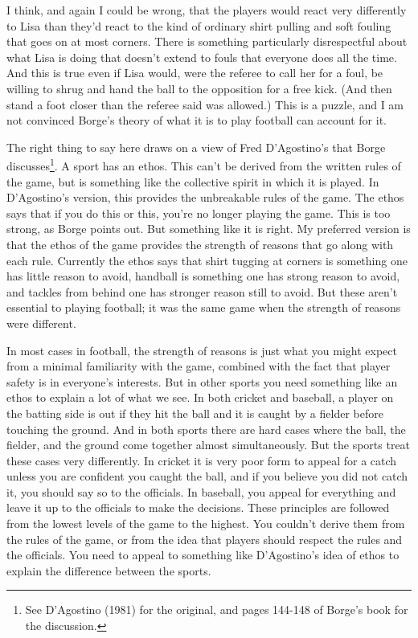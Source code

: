 \documentclass[
  12pt,
]{article}
\begin{document}
I think, and again I could be wrong, that the players would react very differently to Lisa than they'd react to the kind of ordinary shirt pulling and soft fouling that goes on at most corners. There is something particularly disrespectful about what Lisa is doing that doesn't extend to fouls that everyone does all the time. And this is true even if Lisa would, were the referee to call her for a foul, be willing to shrug and hand the ball to the opposition for a free kick. (And then stand a foot closer than the referee said was allowed.) This is a puzzle, and I am not convinced Borge's theory of what it is to play football can account for it.

The right thing to say here draws on a view of Fred D'Agostino's that Borge discusses\footnote{See D'Agostino (1981) for the original, and pages 144-148 of Borge's book for the discussion.}. A sport has an ethos. This can't be derived from the written rules of the game, but is something like the collective spirit in which it is played. In D'Agostino's version, this provides the unbreakable rules of the game. The ethos says that if you do this or this, you're no longer playing the game. This is too strong, as Borge points out. But something like it is right. My preferred version is that the ethos of the game provides the strength of reasons that go along with each rule. Currently the ethos says that shirt tugging at corners is something one has little reason to avoid, handball is something one has strong reason to avoid, and tackles from behind one has stronger reason still to avoid. But these aren't essential to playing football; it was the same game when the strength of reasons were different.

In most cases in football, the strength of reasons is just what you might expect from a minimal familiarity with the game, combined with the fact that player safety is in everyone's interests. But in other sports you need something like an ethos to explain a lot of what we see. In both cricket and baseball, a player on the batting side is out if they hit the ball and it is caught by a fielder before touching the ground. And in both sports there are hard cases where the ball, the fielder, and the ground come together almost simultaneously. But the sports treat these cases very differently. In cricket it is very poor form to appeal for a catch unless you are confident you caught the ball, and if you believe you did not catch it, you should say so to the officials. In baseball, you appeal for everything and leave it up to the officials to make the decisions. These principles are followed from the lowest levels of the game to the highest. You couldn't derive them from the rules of the game, or from the idea that players should respect the rules and the officials. You need to appeal to something like D'Agostino's idea of ethos to explain the difference between the sports.
\end{document}
